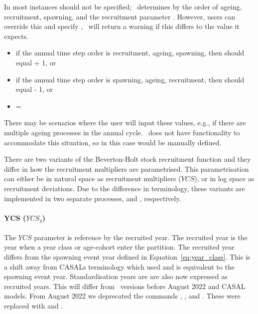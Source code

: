 In most instances  should not be specified; \CNAME\ determines  by the order of ageing, recruitment, spawning, and the recruitment parameter . However, users can override this and specify , \CNAME\ will return a warning if this differs to the value it expects.

\begin{itemize}
	\item if the annual time step order is recruitment, ageing, spawning, then  should equal  + 1, or
	\item if the annual time step order is spawning, ageing, recruitment, then  should equal  - 1, or
	\item {} = 
\end{itemize}

There may be scenarios where the user will input these values, e.g., if there are multiple ageing processes in the annual cycle. \CNAME\ does not have functionality to accommodate this situation, so in this case  would be manually defined.

There are two variants of the Beverton-Holt stock recruitment function and they differ in how the recruitment multipliers are parametrised. This parametrisation can either be in natural space as recruitment multipliers ($YCS$), or in log space as recruitment deviations. Due to the difference in terminology, these variants are implemented in two separate processes,  and , respectively.

\paragraph*{YCS ($YCS_y$)}

The $YCS$ parameter is reference by the recruited year. The recruited year is the year when a year class or age-cohort enter the partition. The recruited year differs from the spawning event year defined in Equation~\eqref{eq:year_class}. This is a shift away from CASALs terminology which used  and is equivalent to the spawning event year. Standardisation years are are also now expressed as recruited years. This will differ from \CNAME\ versions before August 2022 and CASAL models. From August 2022 we deprecated the commands , , and . These were replaced with  and .

